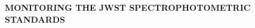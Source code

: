 \documentclass[letterpaper,12pt]{article}
\newcommand{\tess}{{\it TESS}}
\begin{document}
\pagestyle{plain}


 

\begin{center} 
\bfseries\uppercase{%
MONITORING THE JWST SPECTROPHOTOMETRIC STANDARDS
}
\end{center}







\end{document}
